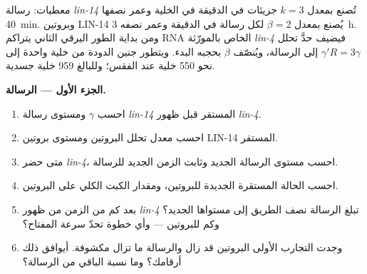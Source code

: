 \begin{problem}
\label{pb:b3:rna-regulation:1}
معطيات: رسالة \emph{lin-14} تُصنع بمعدل $k = 3$ جزيئات في الدقيقة
في الخلية وعمر نصفها \qty{40}{min}. وبروتين LIN-14 يُصنع بمعدل
$\beta = 2$ لكل رسالة في الدقيقة وعمر نصفه \qty{3}{h}. ومن بداية
الطور اليرقي الثاني يتراكم RNA الخاص بالمورّثة \emph{lin-4} فيضيف حدَّ تحلل
$\gamma' R = 3\gamma$ إلى الرسالة، ويُنصّف $\beta$ بحجبه البدء.
ويتطور جنين الدودة من خلية واحدة إلى نحو \num{550} خلية عند الفقس؛
وللبالغ \num{959} خلية جسدية.

\medskip
\noindent\textbf{الجزء الأول --- الرسالة.}
\begin{enumerate}
  \item احسب $\gamma$ ومستوى رسالة \emph{lin-14} المستقر قبل ظهور
        \emph{lin-4}.
  \item احسب معدل تحلل البروتين ومستوى بروتين LIN-14 المستقر.
  \item متى حضر \emph{lin-4}، احسب مستوى الرسالة الجديد وثابت الزمن
        الجديد للرسالة.
  \item احسب الحالة المستقرة الجديدة للبروتين، ومقدار الكبت الكلي
        على البروتين.
  \item بعد كم من الزمن من ظهور \emph{lin-4} تبلغ الرسالة نصف الطريق
        إلى مستواها الجديد؟ وكم للبروتين --- وأي خطوة تحدّ سرعة
        المفتاح؟
  \item وجدت التجارب الأولى البروتين قد زال والرسالة ما تزال مكشوفة.
        أيوافق ذلك أرقامك؟ وما نسبة الباقي من الرسالة؟
\end{enumerate}


\end{problem}
